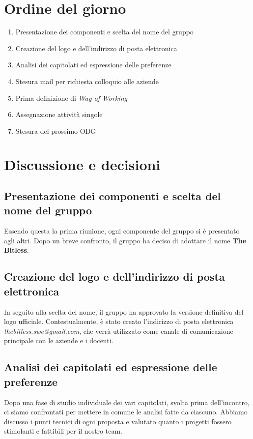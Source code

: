 \documentclass[a4paper, 10pt, colorlinks=true, linkcolor=black, urlcolor=blue, citecolor=blue, hidelinks]{article}
\begin{document}
\section{Ordine del giorno}
\begin{enumerate}
    \item Presentazione dei componenti e scelta del nome del gruppo
    \item Creazione del logo e dell'indirizzo di posta elettronica
    \item Analisi dei capitolati ed espressione delle preferenze
    \item Stesura mail per richiesta colloquio alle aziende
    \item Prima definizione di \textit{Way of Working}
    \item Assegnazione attività singole
    \item Stesura del prossimo ODG
\end{enumerate}

\section{Discussione e decisioni}
\subsection{Presentazione dei componenti e scelta del nome del gruppo}
Essendo questa la prima riunione, ogni componente del gruppo si è presentato agli altri. Dopo un breve confronto, il gruppo ha deciso di adottare il nome \textbf{The Bitless}.

\subsection{Creazione del logo e dell'indirizzo di posta elettronica}
In seguito alla scelta del nome, il gruppo ha approvato la versione definitiva del logo ufficiale. Contestualmente, è stato creato l'indirizzo di posta elettronica \textit{thebitless.swe@gmail.com}, che verrà utilizzato come canale di comunicazione principale con le aziende e i docenti.

\subsection{Analisi dei capitolati ed espressione delle preferenze}
Dopo una fase di studio individuale dei vari capitolati, svolta prima dell'incontro, ci siamo confrontati per mettere in comune le analisi fatte da ciascuno. Abbiamo discusso i punti tecnici di ogni proposta e valutato quanto i progetti fossero stimolanti e fattibili per il nostro team.
\end{document}
